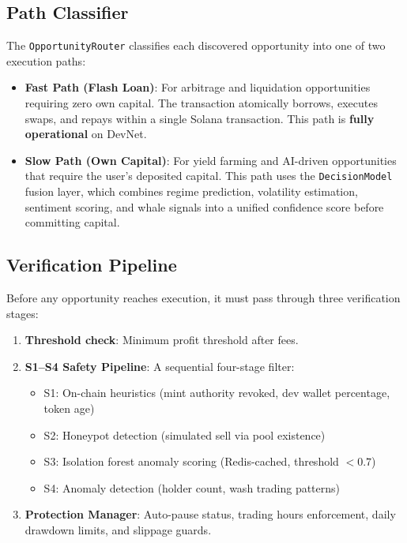 \documentclass[12pt,a4paper]{article}
\begin{document}
\subsection{Path Classifier}

The \texttt{OpportunityRouter} classifies each discovered opportunity into one of two execution paths:

\begin{itemize}[nosep]
    \item \textbf{Fast Path (Flash Loan)}: For arbitrage and liquidation opportunities requiring zero own capital. The transaction atomically borrows, executes swaps, and repays within a single Solana transaction. This path is \textbf{fully operational} on DevNet.
    \item \textbf{Slow Path (Own Capital)}: For yield farming and AI-driven opportunities that require the user's deposited capital. This path uses the \texttt{DecisionModel} fusion layer, which combines regime prediction, volatility estimation, sentiment scoring, and whale signals into a unified confidence score before committing capital.
\end{itemize}

\subsection{Verification Pipeline}

Before any opportunity reaches execution, it must pass through three verification stages:

\begin{enumerate}[nosep]
    \item \textbf{Threshold check}: Minimum profit threshold after fees.
    \item \textbf{S1--S4 Safety Pipeline}: A sequential four-stage filter:
    \begin{itemize}[nosep]
        \item S1: On-chain heuristics (mint authority revoked, dev wallet percentage, token age)
        \item S2: Honeypot detection (simulated sell via pool existence)
        \item S3: Isolation forest anomaly scoring (Redis-cached, threshold $< 0.7$)
        \item S4: Anomaly detection (holder count, wash trading patterns)
    \end{itemize}
    \item \textbf{Protection Manager}: Auto-pause status, trading hours enforcement, daily drawdown limits, and slippage guards.
\end{enumerate}
\end{document}
